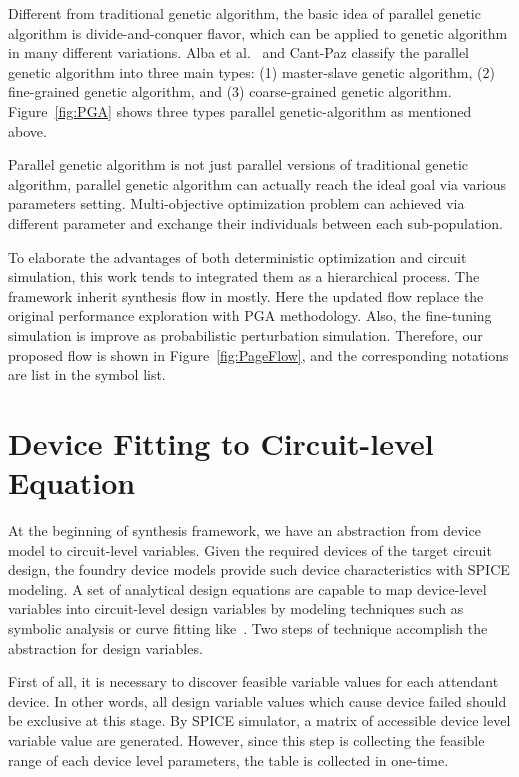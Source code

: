       Different from traditional genetic algorithm, the basic idea of parallel genetic algorithm is divide-and-conquer flavor, which can be applied to genetic algorithm in many different variations. Alba et al.~\cite{SurveyDistPGA1997} and Cant-Paz \cite{SurveyPGA1997} classify the parallel genetic algorithm into three main types: (1) master-slave genetic algorithm, (2) fine-grained genetic algorithm, and (3) coarse-grained genetic algorithm. Figure~\ref{fig:PGA} shows three types parallel genetic-algorithm as mentioned above.
          
      Parallel genetic algorithm is not just parallel versions of traditional genetic algorithm, parallel genetic algorithm can actually reach the ideal goal via various parameters setting. Multi-objective optimization problem can achieved via different parameter and exchange their individuals between each sub-population.

    To elaborate the advantages of both deterministic optimization and circuit simulation, this work tends to integrated them as a hierarchical process. The framework inherit synthesis flow in \cite{PerfMap_ISQED2011} mostly. Here the updated flow replace the original performance exploration with PGA methodology. Also, the fine-tuning simulation is improve as probabilistic perturbation simulation. Therefore, our proposed flow is shown in Figure~\ref{fig:PageFlow}, and the corresponding notations are list in the symbol list.

  \section{Device Fitting to Circuit-level Equation}
    At the beginning of synthesis framework, we have an abstraction from device model to circuit-level variables. Given the required devices of the target circuit design, the foundry device models provide such device characteristics with SPICE modeling. A set of analytical design equations are capable to map device-level variables into circuit-level design variables by modeling techniques such as symbolic analysis or curve fitting like~\cite{PWL_Convex_GP,Eeckelaert_DATE2003,Daems_DAC2002}. Two steps of technique accomplish the abstraction for design variables. 

    First of all, it is necessary to discover feasible variable values for each attendant device. In other words, all design variable values which cause device failed should be exclusive at this stage. By SPICE simulator, a matrix of accessible device level variable value are generated. However, since this step is collecting the feasible range of each device level parameters, the table is collected in one-time. 

